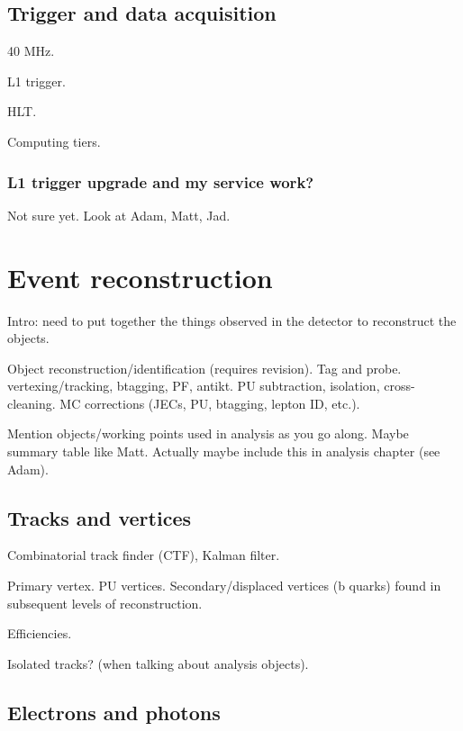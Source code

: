 \subsection{Trigger and data acquisition}

40 MHz.

L1 trigger.

HLT.

Computing tiers.

\subsubsection{L1 trigger upgrade and my service work?}

Not sure yet. Look at Adam, Matt, Jad.

\section{Event reconstruction}

Intro: need to put together the things observed in the detector to reconstruct 
the objects.

Object reconstruction/identification (requires revision).
Tag and probe.
vertexing/tracking, btagging, PF, antikt.
PU subtraction, isolation, cross-cleaning.
MC corrections (JECs, PU, btagging, lepton ID, etc.).

Mention objects/working points used in analysis as you go along. Maybe summary 
table like Matt. Actually maybe include this in analysis chapter (see Adam).

\subsection{Tracks and vertices}

Combinatorial track finder (CTF), Kalman filter.

Primary vertex. PU vertices. Secondary/displaced vertices (b quarks) found in 
subsequent levels of reconstruction.

Efficiencies.

Isolated tracks? (when talking about analysis objects).

\subsection{Electrons and photons}

